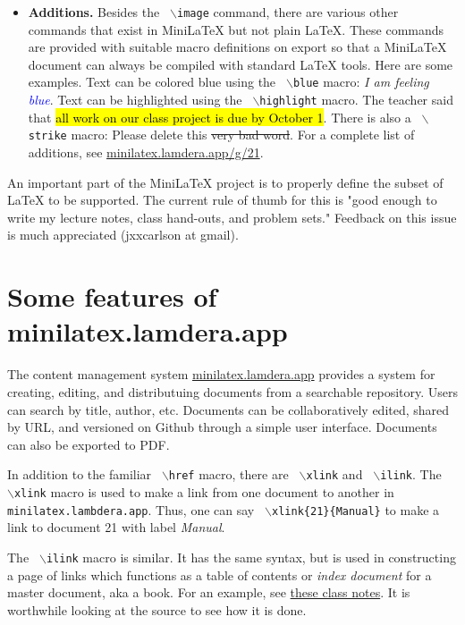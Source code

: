 \documentclass[11pt, oneside]{article}
\newcommand{\code}[1]{{\tt #1}}
\newcommand{\italic}[1]{{\sl #1}}
\newcommand{\strong}[1]{{\bf #1}}
\newcommand{\blue}[1]{\textcolor{blue}{#1}}
\newcommand{\highlight}[1]{\hl{#1}}
\newcommand{\strike}[1]{\st{#1}}
\newcommand{\bs}[1]{$\backslash$#1}
\newcommand{\texarg}[1]{\{#1\}}
\begin{document}
\begin{itemize}
 \item  \strong{Additions.} Besides  the   \code{ \bs{image}} command,  there  are  various  other  commands  that  exist  in  MiniLaTeX  but  not  plain  LaTeX.   These  commands  are  provided  with  suitable  macro  definitions  on  export  so  that  a  MiniLaTeX  document  can  always  be  compiled  with  standard  LaTeX  tools.   Here  are  some  examples.   Text  can  be  colored  blue  using  the   \code{ \bs{blue}} macro:   \italic{I  am  feeling   \blue{blue}}.   Text  can  be  highlighted  using  the   \code{ \bs{highlight}} macro.   The  teacher  said  that   \highlight{all  work  on  our  class  project  is  due  by  October  1}.
 There  is  also  a   \code{ \bs{strike}} macro:  Please  delete  this   \strike{very  bad  word}.   For  a  complete  list  of  additions,  see   \href{https://minilatex.lamdera.app/g/21}{minilatex.lamdera.app/g/21}.
\end{itemize}

An  important  part  of  the  MiniLaTeX  project  is  to  properly  define  the  subset  of  LaTeX  to  be  supported.   The  current  rule  of  thumb  for  this  is  "good  enough  to  write  my  lecture  notes,  class  hand-outs,  and  problem  sets."   Feedback  on  this  issue  is  much  appreciated  (jxxcarlson  at  gmail).



 \section{Some  features  of  minilatex.lamdera.app}
The  content  management  system   \href{https://minilatex.lamdera.app}{minilatex.lamdera.app} provides  a  system  for  creating,  editing,  and  distributuing  documents  from  a  searchable  repository.   Users  can  search  by  title,  author,  etc.   Documents  can  be  collaboratively  edited,  shared  by  URL,  and  versioned  on  Github  through  a  simple  user  interface.   Documents  can  also  be  exported  to  PDF.


In  addition  to  the  familiar   \code{ \bs{href}} macro,  there  are   \code{ \bs{xlink}} and   \code{ \bs{ilink}}.   The   \code{ \bs{xlink}} macro
 is  used  to  make  a  link  from  one  document  to  another  in   \code{minilatex.lambdera.app}.    Thus,  one  can  say
  \code{ \bs{xlink}\texarg{21}\texarg{Manual}} to  make  a  link  to  document 21 with label \italic{Manual}.


The   \code{ \bs{ilink}} macro  is  similar.   It  has  the  same  syntax,  but  is  used  in  constructing  a  page  of  links  which  functions  as  a  table  of  contents  or   \italic{index  document} for  a  master  document,  aka  a  book.   For  an  example,  see   \href{https://minilatex.lamdera.app/g/34}{these  class  notes}.  It  is  worthwhile  looking  at  the  source  to  see  how  it  is  done.
\end{document}
